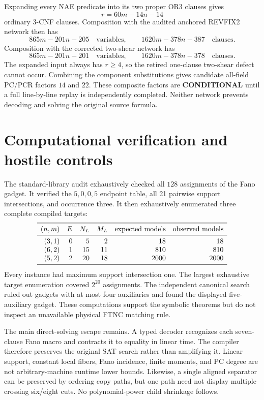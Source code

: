 \documentclass[11pt]{article}
\newcommand{\COND}{\textbf{CONDITIONAL}}
\begin{document}
Expanding every NAE predicate into its two proper OR3 clauses gives
\[
r=60m-14n-14
\]
ordinary 3-CNF clauses.  Composition with the audited anchored REVFIX2 network
then has
\[
865m-201n-205\quad\text{variables},\qquad
1620m-378n-387\quad\text{clauses}.
\]
Composition with the corrected two-shear network has
\[
865m-201n-201\quad\text{variables},\qquad
1620m-378n-378\quad\text{clauses}.
\]
The expanded input always has $r\geq4$, so the retired one-clause two-shear
defect cannot occur.  Combining the component substitutions gives candidate
all-field PC/PCR factors $14$ and $22$.  These composite factors are \COND{}
until a full line-by-line replay is independently completed.  Neither network
prevents decoding and solving the original source formula.

\section{Computational verification and hostile controls}
The standard-library audit exhaustively checked all $128$ assignments of the
Fano gadget.  It verified the $5,0,0,5$ endpoint table, all 21 pairwise support
intersections, and occurrence three.  It then exhaustively enumerated three
complete compiled targets:
\[
\begin{array}{rrrrrr}
\toprule
(n,m)&E&N_L&M_L&\text{expected models}&\text{observed models}\\
\midrule
(3,1)&0&5&2&18&18\\
(6,2)&1&15&11&810&810\\
(5,2)&2&20&18&2000&2000\\
\bottomrule
\end{array}
\]
Every instance had maximum support intersection one.  The largest exhaustive
target enumeration covered $2^{20}$ assignments.  The independent canonical
search ruled out gadgets with at most four auxiliaries and found the displayed
five-auxiliary gadget.  These computations support the symbolic theorems but
do not inspect an unavailable physical FTNC matching rule.

The main direct-solving escape remains.  A typed decoder recognizes each
seven-clause Fano macro and contracts it to equality in linear time.  The
compiler therefore preserves the original SAT search rather than amplifying
it.  Linear support, constant local fibers, Fano incidence, finite moments,
and PC degree are not arbitrary-machine runtime lower bounds.  Likewise, a
single aligned separator can be preserved by ordering copy paths, but one
path need not display multiple crossing six/eight cuts.  No polynomial-power
child shrinkage follows.
\end{document}
